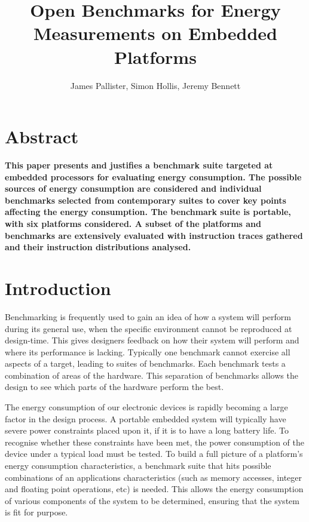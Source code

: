 \documentclass[twocolumn]{article}
\title{\bfseries\fontsize{22}{1}\selectfont Open Benchmarks for Energy Measurements on Embedded Platforms}
\author{James Pallister, Simon Hollis, Jeremy Bennett}
\newcommand{\nsection}[1]{\section{\bfseries #1}}
\begin{document}
\maketitle
\nsection{Abstract}

\textbf{This paper presents and justifies a benchmark suite targeted at embedded processors for evaluating energy consumption. The possible sources of energy consumption are considered and individual benchmarks selected from contemporary suites to cover key points affecting the energy consumption. The benchmark suite is portable, with six platforms considered. A subset of the platforms and benchmarks are extensively evaluated with instruction traces gathered and their instruction distributions analysed.}

\nsection{Introduction}

Benchmarking is frequently used to gain an idea of how a system will perform during its general use, when the specific environment cannot be reproduced at design-time. This gives designers feedback on how their system will perform and where its performance is lacking. Typically one benchmark cannot exercise all aspects of a target, leading to suites of benchmarks. Each benchmark tests a combination of areas of the hardware. This separation of benchmarks allows the design to see which parts of the hardware perform the best.

The energy consumption of our electronic devices is rapidly becoming a large factor in the design process. A portable embedded system will typically have severe power constraints placed upon it, if it is to have a long battery life. To recognise whether these constraints have been met, the power consumption of the device under a typical load must be tested. To build a full picture of a platform’s energy consumption characteristics, a benchmark suite that hits possible combinations of an applications characteristics (such as memory accesses, integer and floating point operations, etc) is needed. This allows the energy consumption of various components of the system to be determined, ensuring that the system is fit for purpose.
\end{document}
